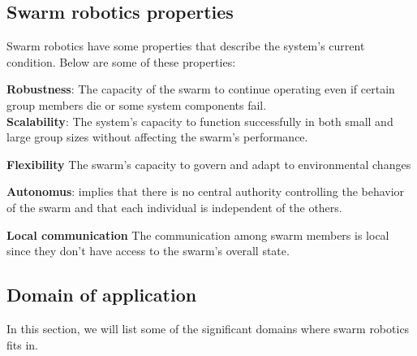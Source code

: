 \documentclass[12pt]{extarticle}
\begin{document}
\subsection{Swarm robotics properties}
Swarm robotics have some properties that describe the system's current condition. Below are some of these properties:

\textbf{Robustness}: The capacity of the swarm to continue operating even if certain group members die or some system components fail.\\ \textbf{Scalability}: The system's capacity to function successfully in both small and large group sizes without affecting the swarm's performance.

\textbf{Flexibility} The swarm's capacity to govern and adapt to environmental changes 

\textbf{Autonomus}: implies that there is no central authority controlling the behavior of the swarm and that each individual is independent of the others.

\textbf{Local communication} The communication among swarm members is local since they don't have access to the swarm's overall state. \cite{brambilla2013swarm}\cite{olaronke2020systematic}
  

\subsection{Domain of application}
In this section, we will list some of the significant domains where swarm robotics fits in. \cite{csahin2005swarm}\cite{olaronke2020systematic}
\end{document}
